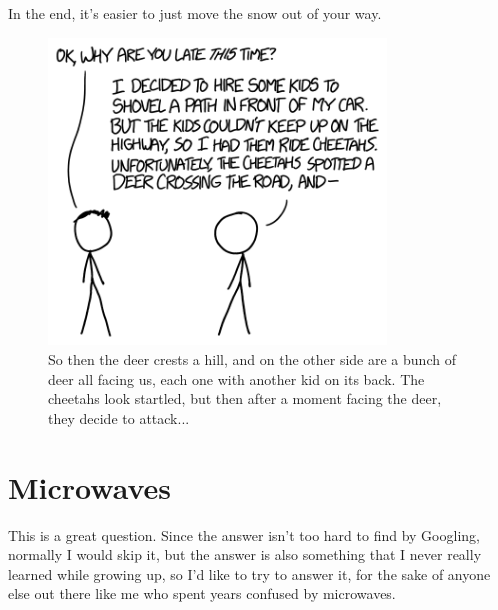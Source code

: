 {{In the end, it's easier to just move the snow out of your way.}

\begin{figure}[!htbp]
\centering
\includegraphics[scale=0.5, max width=0.8\textwidth]{imgs/a/130/cheetahs.png}
\caption{So then the deer crests a hill, and on the other side are a bunch of deer all facing us, each one with another kid on its back. The cheetahs look startled, but then after a moment facing the deer, they decide to attack...}
\end{figure}

{
\chapter{Microwaves}
}

\hfill{}

{This is a great question. Since the answer isn't too hard to find by Googling, normally I would skip it, but the answer is also something that I never really learned while growing up, so I'd like to try to answer it, for the sake of anyone else out there like me who spent years confused by microwaves.}

}
